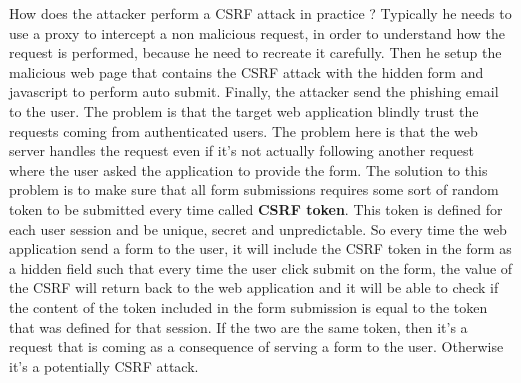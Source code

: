 How does the attacker perform a CSRF attack in practice ? Typically he needs to use a proxy to intercept a non malicious request, in order to understand how the request is performed, because he need to recreate it carefully. Then he setup the malicious web page that contains the CSRF attack with the hidden form and javascript to perform auto submit. Finally, the attacker send the phishing email to the user. The problem is that the target web application blindly trust the requests coming from authenticated users. The problem here is that the web server handles the request even if it's not actually following another request where the user asked the application to provide the form. The solution to this problem is to make sure that all form submissions requires some sort of random token to be submitted every time called \textbf{CSRF token}. This token is defined for each user session and be unique, secret and unpredictable. So every time the web application send a form to the user, it will include the CSRF token in the form as a hidden field such that every time the user click submit on the form, the value of the CSRF will return back to the web application and it will be able to check if the content of the token included in the form submission is equal to the token that was defined for that session. If the two are the same token, then it's a request that is coming as a consequence of serving a form to the user. Otherwise it's a potentially CSRF attack.

